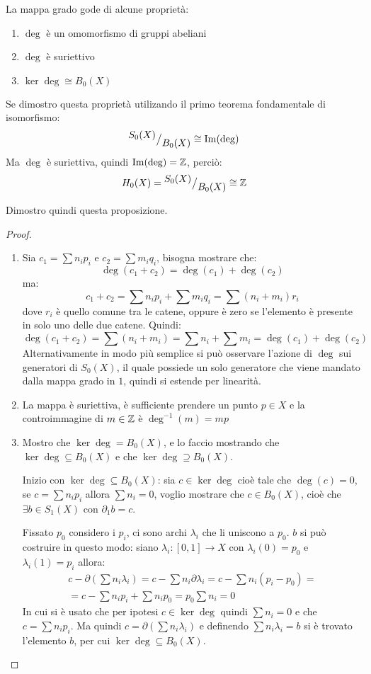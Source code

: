 \begin{proposition}
  La mappa grado gode di alcune proprietà:
  \begin{enumerate}
  \item $ \deg $ è un omomorfismo di gruppi abeliani
  \item $ \deg $ è suriettivo
  \item $ \ker{\deg} \cong B_0(X) $
  \end{enumerate}
  Se dimostro questa proprietà utilizando il primo teorema fondamentale di isomorfismo:
  \[
    {^{\textstyle S_0(X)}\big/_{\textstyle B_0(X)}} \cong \mathrm{Im}( \deg )
  \]
  Ma $ \deg $ è suriettiva, quindi $ \mathrm{Im}( \deg ) = \mathbb{Z} $, perciò:
  \[
    H_0(X) = {^{\textstyle S_0(X)}\big/_{\textstyle B_0(X)}} \cong \mathbb{Z}
  \]
\end{proposition}
Dimostro quindi questa proposizione. \\
\begin{proof}
  \begin{enumerate}
  \item
    Sia $ c_1 = \sum n_i p_i $ e $ c_2 = \sum m_i q_i $, bisogna mostrare che:
    \[
      \deg(c_1 + c_2) = \deg(c_1) + \deg(c_2)
    \]
    ma:
    \[
      c_1 + c_2 = \sum n_i p_i + \sum m_i q_i = \sum (n_i + m_i)r_i
    \]
    dove $ r_i $ è quello comune tra le catene, oppure è zero se
    l'elemento è presente in solo uno delle due catene.
    Quindi:
    \[
      \deg(c_1 + c_2) = \sum (n_i + m_i) = \sum n_i + \sum m_i = \deg(c_1) + \deg(c_2)
    \]
    Alternativamente in modo più semplice si può osservare l'azione di $ \deg $
    sui generatori di $ S_0(X) $, il quale possiede un solo generatore che viene
    mandato dalla mappa grado in $ 1 $, quindi si estende per linearità.
  \item
    La mappa è suriettiva, è sufficiente prendere un punto $ p \in X $
    e la controimmagine di $ m \in \mathbb{Z} $ è $ \deg^{-1}(m) = mp $
  \item
    Mostro che $ \ker{\deg} = B_0(X) $, e lo faccio mostrando che $ \ker{\deg} \subseteq B_0(X) $
    e che  $ \ker{\deg} \supseteq B_0(X) $.

    Inizio con $ \ker{\deg} \subseteq B_0(X) $: sia $ c \in \ker{\deg} $ cioè tale che $ \deg(c) = 0 $,
    se $ c = \sum n_i p_i $ allora $ \sum n_i = 0 $, voglio mostrare che $ c \in B_0(X) $,
    cioè che $ \exists b \in S_1(X) $ con $ \partial_1 b = c $.

    Fissato $ p_0 $ considero i $ p_i $, ci sono archi
    $ \lambda_i $ che li uniscono a $ p_0 $. $ b $ si può costruire in questo modo: siano
    $ \lambda_i : [0,1] \to X $ con $ \lambda_i(0) = p_0 $ e $ \lambda_i(1) = p_i $ allora:
    \begin{gather*}
      c - \partial\left(\sum n_i \lambda_i \right) =  c - \sum n_i \partial \lambda_i = c - \sum n_i (p_i - p_0) = \\
      = c - \sum n_i p_i
      + \sum n_i p_0 = p_0 \sum n_i = 0
    \end{gather*}
    In cui si è usato che per ipotesi $ c \in \ker{\deg} $ quindi $ \sum n_i = 0 $ e che $ c = \sum n_i p_i  $.
    Ma quindi $ c = \partial(\sum n_i \lambda_i) $ e definendo $ \sum n_i \lambda_i = b $ si è trovato l'elemento $ b $,
    per cui $ \ker{\deg} \subseteq B_0(X) $.


\end{enumerate}
\end{proof}
